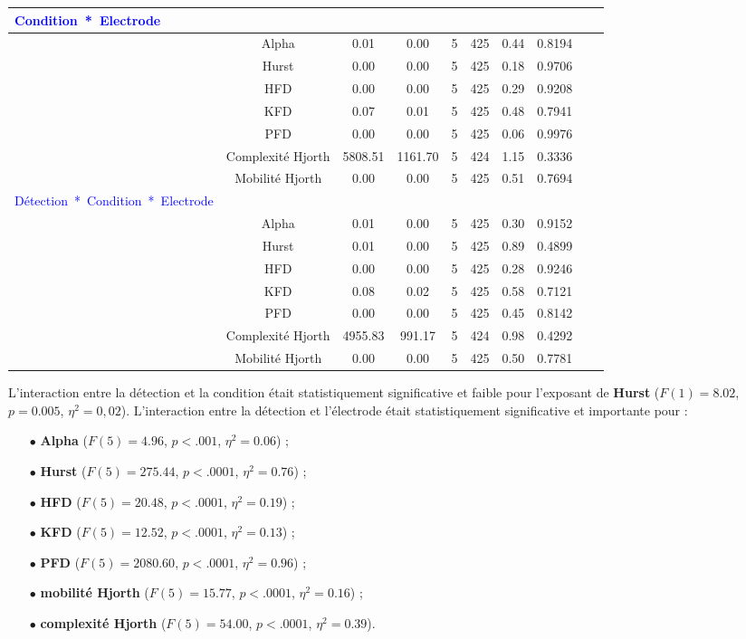 \begin{table}[!t]
\begin{tabular}{|l|*{9}{c|}}
\hline
\textcolor{blue}{Condition~*~Electrode} & & & & & & & & \\ 
\hline
& Alpha & 0.01 & 0.00 & 5 & 425 & 0.44 & 0.8194 & \\ 
& Hurst & 0.00 & 0.00 & 5 & 425 & 0.18 & 0.9706 & \\ 
& HFD & 0.00 & 0.00 & 5 & 425 & 0.29 & 0.9208 & \\ 
& KFD & 0.07 & 0.01 & 5 & 425 & 0.48 & 0.7941 & \\ 
& PFD & 0.00 & 0.00 & 5 & 425 & 0.06 & 0.9976 & \\ 
& Complexité Hjorth & 5808.51 & 1161.70 & 5 & 424 & 1.15 & 0.3336 & \\ 
& Mobilité Hjorth & 0.00 & 0.00 & 5 & 425 & 0.51 & 0.7694 & \\ 
\hline
\textcolor{blue}{Détection~*~Condition~*~Electrode} & & & & & & & & \\ 
\hline
& Alpha & 0.01 & 0.00 & 5 & 425 & 0.30 & 0.9152 & \\ 
& Hurst & 0.01 & 0.00 & 5 & 425 & 0.89 & 0.4899 & \\ 
& HFD & 0.00 & 0.00 & 5 & 425 & 0.28 & 0.9246 & \\ 
& KFD & 0.08 & 0.02 & 5 & 425 & 0.58 & 0.7121 & \\ 
& PFD & 0.00 & 0.00 & 5 & 425 & 0.45 & 0.8142 & \\ 
& Complexité Hjorth & 4955.83 & 991.17 & 5 & 424 & 0.98 & 0.4292 & \\ 
& Mobilité Hjorth & 0.00 & 0.00 & 5 & 425 & 0.50 & 0.7781 & \\ 
\hline
\end{tabular}

\end{table}

L'interaction entre la détection et la condition était statistiquement significative et faible pour l'exposant de \textbf{Hurst} ($F(1)=8.02$, $p=0.005$, $\eta^2=0,02$). 
L'interaction entre la détection et l'électrode était statistiquement significative et importante pour :
\begin{itemize}
\item[$\bullet$] \textbf{Alpha} ($F(5)=4.96$, $p<.001$, $\eta^2=0.06$) ;
\item[$\bullet$] \textbf{Hurst} ($F(5)=275.44$, $p<.0001$, $\eta^2=0.76$) ; 
\item[$\bullet$] \textbf{HFD} ($F(5)=20.48$, $p<.0001$, $\eta^2=0.19$) ;
\item[$\bullet$] \textbf{KFD} ($F(5)=12.52$, $p<.0001$, $\eta^2=0.13$) ;
\item[$\bullet$] \textbf{PFD} ($F(5)=2080.60$, $p<.0001$, $\eta^2=0.96$) ; 
\item[$\bullet$] \textbf{mobilité Hjorth} ($F(5)=15.77$, $p<.0001$, $\eta^2=0.16$) ;
\item[$\bullet$] \textbf{complexité Hjorth} ($F(5)=54.00$, $p<.0001$, $\eta^2=0.39$). \\
\end{itemize}

